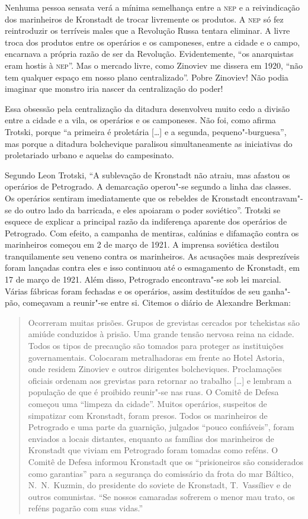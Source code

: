 Nenhuma pessoa sensata verá a mínima semelhança entre a \textsc{nep} e a
reivindicação dos marinheiros de Kronstadt de trocar livremente os
produtos. A \textsc{nep} só fez reintroduzir os terríveis males que a
Revolução Russa tentara eliminar. A livre troca dos produtos entre os
operários e os camponeses, entre a cidade e o campo, encarnava a
própria razão de ser da Revolução. Evidentemente, “os anarquistas eram
hostis à \textsc{nep}”. Mas o mercado livre, como Zinoviev me dissera em
1920, “não tem qualquer espaço em nosso plano centralizado”. Pobre
Zinoviev! Não podia imaginar que monstro iria nascer da centralização
do poder!

Essa obsessão pela centralização da ditadura desenvolveu muito cedo
a divisão entre a cidade e a vila, os operários e os camponeses. Não
foi, como afirma Trotski, porque “a primeira é proletária [\ldots] e a
segunda, pequeno"-burguesa”, mas porque a ditadura bolchevique
paralisou simultaneamente as iniciativas do proletariado urbano e
aquelas do campesinato.

Segundo Leon Trotski, “A sublevação de Kronstadt não atraiu, mas afastou
os operários de Petrogrado. A demarcação operou"-se segundo a linha
das classes. Os operários sentiram imediatamente que os rebeldes de
Kronstadt encontravam"-se do outro lado da barricada, e eles apoiaram
o poder soviético”. Trotski se esquece de explicar a principal razão da
indiferença aparente dos operários de Petrogrado. Com efeito, a
campanha de mentiras, calúnias e difamação contra os marinheiros
começou em 2 de março de 1921. A imprensa soviética destilou
tranquilamente seu veneno contra os marinheiros. As acusações mais
desprezíveis foram lançadas contra eles e isso continuou até o
esmagamento de Kronstadt, em 17 de março de 1921. Além disso,
Petrogrado encontrava"-se sob lei marcial. Várias fábricas foram
fechadas e os operários, assim destituídos de seu ganha"-pão, começavam
a reunir"-se entre si. Citemos o diário de Alexandre Berkman:

\begin{quote}
Ocorreram muitas prisões. Grupos de grevistas cercados por tchekistas
são amiúde conduzidos à prisão. Uma grande tensão nervosa reina na
cidade. Todos os tipos de precaução são tomados para proteger as
instituições governamentais. Colocaram metralhadoras em frente ao Hotel
Astoria, onde residem Zinoviev e outros dirigentes bolcheviques.
Proclamações oficiais ordenam aos grevistas para retornar ao trabalho
[\ldots] e lembram a população de que é proibido reunir"-se nas ruas. O
Comitê de Defesa começou uma “limpeza da cidade”. Muitos operários,
suspeitos de simpatizar com Kronstadt, foram presos. Todos os
marinheiros de Petrogrado e uma parte da guarnição, julgados “pouco
confiáveis”, foram enviados a locais distantes, enquanto as famílias dos
marinheiros de Kronstadt que viviam em Petrogrado foram tomadas como
reféns. O Comitê de Defesa informou Kronstadt que os “prisioneiros são
considerados como garantias” para a segurança do comissário da frota do
mar Báltico, N.~N.~Kuzmin, do presidente do soviete de Kronstadt, 
T.~Vassíliev e de outros comunistas. “Se nossos camaradas sofrerem o menor
mau trato, os reféns pagarão com suas vidas.”
\end{quote}

